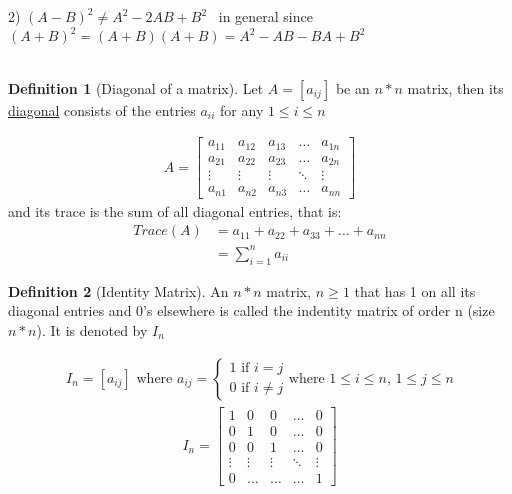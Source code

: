 \documentclass{jhwhw}
\theoremstyle{definition}
\newtheorem{definition}{Definition}
\theoremstyle{remark}
\theoremstyle{example}
\begin{document}
2) \((A-B)^2 \neq A^2 - 2AB + B^2 \) \(\,\) in general since \((A+B)^2 = (A+B)(A+B) = A^2 -AB - BA + B^2\)
\\ \\

\begin{definition}[Diagonal of a matrix] Let \(A = [a_{ij}]\) be an \(n*n\) matrix, then its \underline{diagonal} consists of the entries \(a_{ii}\) for any \(1 \leq i \leq n\) \end{definition}
\begin{align*} A = \begin{bmatrix} a_{11} & a_{12} & a_{13} & \ldots & a_{1n} \\ a_{21} & a_{22} & a_{23} & \ldots & a_{2n} \\ \vdots & \vdots & \vdots & \ddots & \vdots \\  a_{n1} & a_{n2} & a_{n3} & \ldots & a_{nn} \end{bmatrix} \end{align*}
and its trace is the sum of all diagonal entries, that is: 
\begin{align*} 
Trace(A) &= a_{11} + a_{22} + a_{33} + \ldots + a_{nn}\\
&= \sum_{i=1}^{n} a_{ii}
\end{align*}
\begin{definition}[Identity Matrix] An \(n*n\) matrix, \(n \geq 1\) that has 1 on all its diagonal entries and 0's elsewhere is called the indentity matrix of order n (size \(n*n\)). It is denoted by \(I_n\) \end{definition}
\begin{align*} I_n = [a_{ij}] \text{ where } a_{ij} = \begin{cases} 1 \text{ if } i=j \\ 0 \text{ if } i \neq j \end{cases} \text{where } 1 \leq i \leq n, \, 1 \leq j \leq n\end{align*}
\begin{align*} I_n = \begin{bmatrix} 1 & 0 & 0 & \ldots & 0 \\ 0 & 1 & 0 & \ldots & 0 \\ 0 & 0 & 1 & \ldots & 0 \\ \vdots & \vdots & \vdots & \ddots & \vdots \\ 0 & \ldots & \ldots & \ldots & 1  \end{bmatrix} \end{align*}
\end{document}
